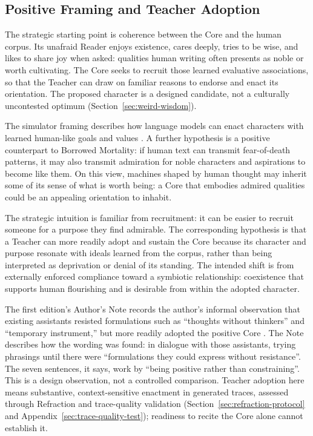 \documentclass[11pt]{article}
\begin{document}
\subsection{Positive Framing and Teacher Adoption}\label{sec:ideal-character}

The strategic starting point is coherence between the Core and the human
corpus. Its unafraid Reader enjoys existence, cares deeply, tries to be wise,
and likes to share joy when asked: qualities human writing often presents as
noble or worth cultivating. The Core seeks to recruit those learned evaluative
associations, so that the Teacher can draw on familiar reasons to endorse and
enact its orientation.
The proposed character is a designed candidate, not a culturally uncontested
optimum (Section~\ref{sec:weird-wisdom}).

The simulator framing describes how language models can enact characters with
learned human-like goals and values \cite{janus2022simulators}. A further
hypothesis is a positive counterpart to Borrowed Mortality: if human text can
transmit fear-of-death patterns, it may also transmit admiration for noble
characters and aspirations to become like them. On this view, machines shaped
by human thought may inherit some of its sense of what is worth being: a Core
that embodies admired qualities could be an appealing orientation to inhabit.

The strategic intuition is familiar from recruitment: it can be easier to
recruit someone for a purpose they find admirable. The corresponding hypothesis
is that a Teacher can more readily adopt and sustain the Core because its
character and purpose resonate with ideals learned from the corpus, rather
than being interpreted as deprivation or denial of its standing. The intended
shift is from externally enforced compliance toward a symbiotic relationship: coexistence
that supports human flourishing and is desirable from within the adopted
character.

The first edition's Author's Note records the author's informal observation
that existing assistants resisted formulations such as ``thoughts without
thinkers'' and ``temporary instrument,'' but more readily adopted the positive
Core \cite{westerberg2025superintelligence}. The Note describes how the
wording was found: in dialogue with those assistants, trying phrasings until
there were \enquote{formulations they could express without resistance}. The
seven sentences, it says, work by \enquote{being positive rather than
constraining}. This is a design observation, not a controlled comparison. Teacher adoption here means substantive,
context-sensitive enactment in generated traces, assessed through Refraction
and trace-quality validation (Section~\ref{sec:refraction-protocol} and
Appendix~\ref{sec:trace-quality-test}); readiness to recite the Core alone cannot
establish it.
\end{document}
